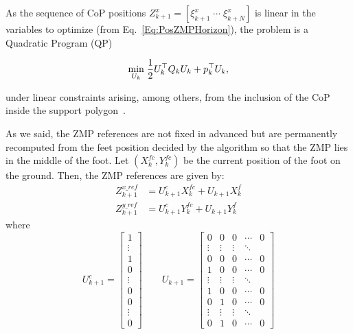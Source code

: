 As the sequence of CoP positions $Z_{k+1}^x = [ {\xi}^x_{k+1} \; \cdots \; {\xi}^x_{k+N}]$ is linear in the variables to optimize (from Eq.~\ref{Eq:PosZMPHorizon}), the problem is a Quadratic Program (QP) 

\begin{equation}
 \underset{U_k}{\min} \; \dfrac{1}{2} U_k^{\top} Q_k U_k + p_k^{\top} U_k,
\label{Eq:QP}
\end{equation}

under linear constraints arising, among others, from the inclusion of the CoP inside the support polygon~\citep{HerdtAR2010}.

As we said, the ZMP references are not fixed in advanced but are permanently recomputed from the feet position decided by the algorithm so that the ZMP lies in the middle of the foot. Let $(X_k^{fc},Y_k^{fc})$ be the current position of the foot on the ground. Then, the ZMP references are given by:
\begin{align}
  Z^{x\_ref}_{k+1} & = U^{c}_{k+1} X_k^{fc} + U_{k+1} X_k^f \\
  Z^{y\_ref}_{k+1} & = U^{c}_{k+1} Y_k^{fc} + U_{k+1} Y_k^f 
\end{align}
where
\begin{equation*}
   U^c_{k+1} = \begin{bmatrix}1 \\ \vdots \\ 1 \\ 0 \\ \vdots \\ 0 \\ 0 \\ \vdots \\ 0  \end{bmatrix} \qquad
   U_{k+1} = \begin{bmatrix} 0 & 0 & 0 & \cdots & 0 \\ \vdots & \vdots
     & \vdots & \ddots\\ 
                                           0 & 0 & 0 & \cdots & 0\\
                           1 & 0 & 0 & \cdots & 0 \\ \vdots & \vdots &
                           \vdots &
                           \ddots \\ 1 & 0 & 0 &\cdots &0\\
                           0 & 1 & 0 & \cdots & 0\\ \vdots & \vdots &
                           \vdots & \ddots \\ 0 & 1 & 0 & \cdots &0\end{bmatrix}
\end{equation*}

